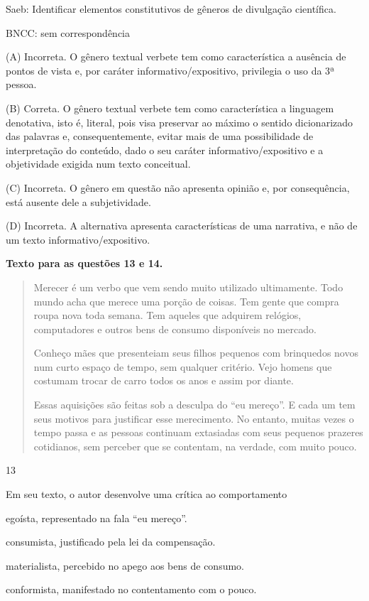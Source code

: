 Saeb: Identificar elementos constitutivos de gêneros de divulgação
científica.

BNCC: sem correspondência

(A) Incorreta. O gênero textual verbete tem como característica a
ausência de pontos de vista e, por caráter informativo/expositivo,
privilegia o uso da 3ª pessoa.

(B) Correta. O gênero textual verbete tem como característica a
linguagem denotativa, isto é, literal, pois visa preservar ao máximo o
sentido dicionarizado das palavras e, consequentemente, evitar mais de
uma possibilidade de interpretação do conteúdo, dado o seu caráter
informativo/expositivo e a objetividade exigida num texto conceitual.

(C) Incorreta. O gênero em questão não apresenta opinião e, por
consequência, está ausente dele a subjetividade.

(D) Incorreta. A alternativa apresenta características de uma narrativa,
e não de um texto informativo/expositivo.

\textbf{Texto para as questões 13 e 14.}

\begin{quote}
Merecer é um verbo que vem sendo muito utilizado ultimamente. Todo mundo
acha que merece uma porção de coisas. Tem gente que compra roupa nova
toda semana. Tem aqueles que adquirem relógios, computadores e outros
bens de consumo disponíveis no mercado.

Conheço mães que presenteiam seus filhos pequenos com brinquedos novos
num curto espaço de tempo, sem qualquer critério. Vejo homens que
costumam trocar de carro todos os anos e assim por diante.

Essas aquisições são feitas sob a desculpa do ``eu mereço''. E cada um
tem seus motivos para justificar esse merecimento. No entanto, muitas
vezes o tempo passa e as pessoas continuam extasiadas com seus pequenos
prazeres cotidianos, sem perceber que se contentam, na verdade, com
muito pouco.
\end{quote}


\num{13}

Em seu texto, o autor desenvolve uma crítica ao comportamento

\begin{escolha}
\item egoísta, representado na fala ``eu mereço''.

\item consumista, justificado pela lei da compensação.

\item materialista, percebido no apego aos bens de consumo.

\item conformista, manifestado no contentamento com o pouco.
\end{escolha}

